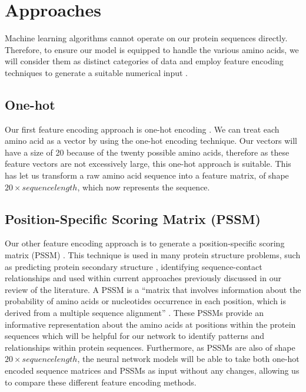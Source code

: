 \documentclass{l4proj}
\begin{document}
\section{Approaches}

Machine learning algorithms cannot operate on our protein sequences directly. Therefore, to ensure our model is equipped to handle the various amino acids, we will consider them as distinct categories of data and employ feature encoding techniques to generate a suitable numerical input \citep{Kumar:20}.

\subsection{One-hot}

Our first feature encoding approach is one-hot encoding \citep{One-hot:wiki} \citep{Fawcett:21}. We can treat each amino acid as a vector by using the one-hot encoding technique. Our vectors will have a size of 20 because of the twenty possible amino acids, therefore as these feature vectors are not excessively large, this one-hot approach is suitable. This has let us transform a raw amino acid sequence into a feature matrix, of shape $20 \times sequence length$, which now represents the sequence.

\subsection{Position-Specific Scoring Matrix (PSSM)}

Our other feature encoding approach is to generate a position-specific scoring matrix (PSSM) \citep{PSSM:wiki}. This technique is used in many protein structure problems, such as predicting protein secondary structure \citep{McGuffin:00}, identifying sequence-contact relationships \citep{Wang:17} and used within current approaches previously discussed in our review of the literature. A PSSM is a “matrix that involves information about the probability of amino acids or nucleotides occurrence in each position, which is derived from a multiple sequence alignment” \citep{Mohammadi:22}. These PSSMs provide an informative representation about the amino acids at positions within the protein sequences which will be helpful for our network to identify patterns and relationships within protein sequences. Furthermore, as PSSMs are also of shape $20 \times sequence length$, the neural network models will be able to take both one-hot encoded sequence matrices and PSSMs as input without any changes, allowing us to compare these different feature encoding methods.
\end{document}
